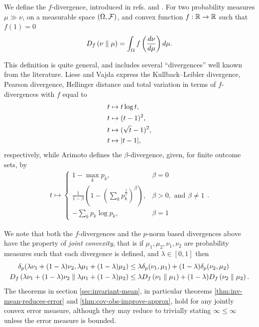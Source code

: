 We define the $f$-divergence, introduced in refs. \cite{10.2307/2984279} and \cite{der1964informationstheoretische}. For two probability measures $\mu\gg\nu$, on a measurable space $(\Omega, \mathcal{F})$, and convex function $f:\mathbb{R}\to\mathbb{R}$ such that $f(1) = 0$
\begin{align}\label{eqn:f-div-defn}
  D_{f}\left({\nu}\parallel{\mu}\right) = \int_\Omega f\left(\frac{d\nu}{d\mu}\right) d\mu.
\end{align}

This definition is quite general, and includes several ``divergences'' well known from the literature. Liese and Vajda \cite{1705001g} express the Kullback–Leibler divergence, Pearson divergence, Hellinger distance and total variation in terms of $f$-divergences with $f$ equal to
\begin{align}
  t&\mapsto t\log t,\\
  t&\mapsto (t-1)^2,\\
  t&\mapsto (\sqrt{t} -1)^2,\\
  t&\mapsto {\left\lvert{t-1}\right\rvert},
\end{align}
respectively, while Arimoto defines the $\beta$-divergence, given, for finite outcome sets, by
\begin{align}
  t \mapsto \begin{cases}1-\max_k p_k, & \beta = 0\\ \frac{1}{1-\beta}\left(1- \left(\sum_k p_k^\frac{1}{\beta}\right)^\beta\right), &\beta >0, \text{ and } \beta\neq 1 \\ -\sum_k p_k \log p_k, & \beta = 1\end{cases}.
\end{align}

We note that both the $f$-divergences and the $p$-norm based divergences above have the property of \emph{joint convexity}, that is if $\mu_1, \mu_2, \nu_1,\nu_2$ are probability measures such that each divergence is defined, and $\lambda\in [0,1]$ then
\begin{align}
  \delta_p(\lambda\nu_1 + (1-\lambda)\nu_2, \lambda\mu_1 + (1-\lambda)\mu_2) &\leq \lambda \delta_p(\nu_1, \mu_1) + (1-\lambda)\delta_p(\nu_2, \mu_2)\\
  D_{f}\left({\lambda\nu_1 + (1-\lambda)\nu_2}\parallel{\lambda\mu_1 + (1-\lambda)\mu_2}\right) &\leq  \lambda D_{f}\left({\nu_1}\parallel{\mu_1}\right) + (1-\lambda)D_{f}\left({\nu_2}\parallel{\mu_2}\right).
\end{align}
The theorems in section \ref{sec:invariant-mean}, in particular theorems \ref{thm:inv-mean-reduces-error} and \ref{thm:cov-obs-improve-approx}, hold for any jointly convex error measure, although they may reduce to trivially stating $\infty \leq \infty$ unless the error measure is bounded.
